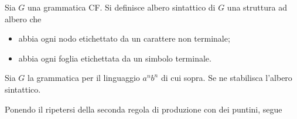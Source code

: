 \documentclass{subfiles}
\begin{document}
\begin{Definition*}
    Sia \(G\) una grammatica CF. Si definisce albero sintattico di \(G\) una struttura ad albero che
    \begin{itemize}
        \item abbia ogni nodo etichettato da un carattere non terminale;
        \item abbia ogni foglia etichettata da un simbolo terminale.
    \end{itemize}
\end{Definition*}

\begin{Example*}
    Sia \(G\) la grammatica per il linguaggio \(a^{n}b^{n}\) di cui sopra. Se ne stabilisca l'albero sintattico.
    \begin{Solution*}
        Ponendo il ripetersi della seconda regola di produzione con dei puntini, segue
        
    \end{Solution*}
\end{Example*}
\end{document}

